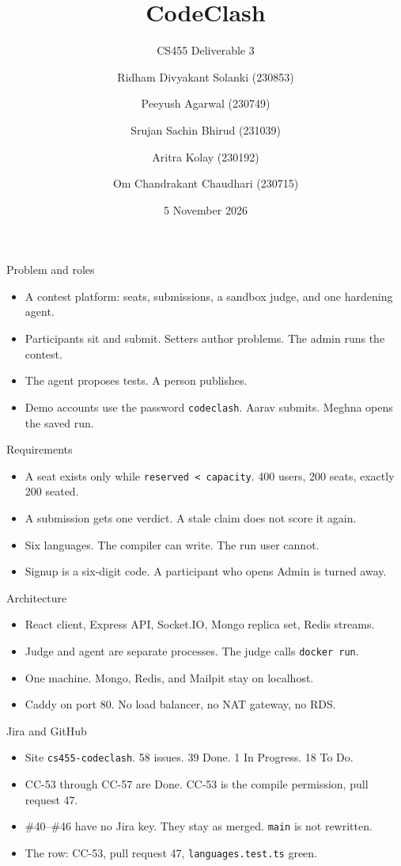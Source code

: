 \documentclass[aspectratio=169]{beamer}
\title{CodeClash}
\subtitle{CS455 \quad Deliverable 3}
\author{Ridham Divyakant Solanki (230853) \and Peeyush Agarwal (230749) \and Srujan Sachin Bhirud (231039) \and Aritra Kolay (230192) \and Om Chandrakant Chaudhari (230715)}
\institute{\url{https://github.com/SrujanBhirud/CodeClash}}
\date{5 November 2026}
\begin{document}
\begin{frame}
\titlepage
\end{frame}

\begin{frame}{Problem and roles}
\begin{itemize}
\item A contest platform: seats, submissions, a sandbox judge, and one hardening agent.
\item Participants sit and submit. Setters author problems. The admin runs the contest.
\item The agent proposes tests. A person publishes.
\item Demo accounts use the password \texttt{codeclash}. Aarav submits. Meghna opens the saved run.
\end{itemize}
\end{frame}

\begin{frame}{Requirements}
\begin{itemize}
\item A seat exists only while \texttt{reserved < capacity}. 400 users, 200 seats, exactly 200 seated.
\item A submission gets one verdict. A stale claim does not score it again.
\item Six languages. The compiler can write. The run user cannot.
\item Signup is a six-digit code. A participant who opens Admin is turned away.
\end{itemize}
\end{frame}

\begin{frame}{Architecture}
\begin{itemize}
\item React client, Express API, Socket.IO, Mongo replica set, Redis streams.
\item Judge and agent are separate processes. The judge calls \texttt{docker run}.
\item One machine. Mongo, Redis, and Mailpit stay on localhost.
\item Caddy on port 80. No load balancer, no NAT gateway, no RDS.
\end{itemize}
\end{frame}

\begin{frame}{Jira and GitHub}
\begin{itemize}
\item Site \texttt{cs455-codeclash}. 58 issues. 39 Done. 1 In Progress. 18 To Do.
\item CC-53 through CC-57 are Done. CC-53 is the compile permission, pull request 47.
\item \#40--\#46 have no Jira key. They stay as merged. \texttt{main} is not rewritten.
\item The row: CC-53, pull request 47, \texttt{languages.test.ts} green.
\end{itemize}
\end{frame}
\end{document}

